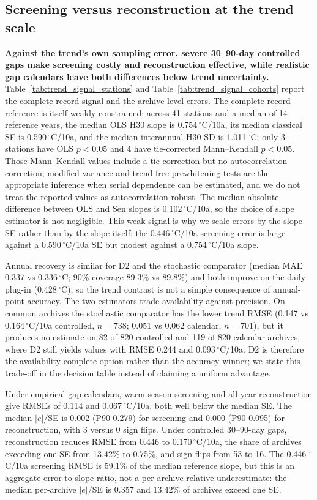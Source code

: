\subsection{Screening versus reconstruction at the trend scale}

\textbf{Against the trend's own sampling error, severe 30--90-day controlled gaps make screening costly and reconstruction effective, while realistic gap calendars leave both differences below trend uncertainty.} Table~\ref{tab:trend_signal_stations} and Table~\ref{tab:trend_signal_cohorts} report the complete-record signal and the archive-level errors. The complete-record reference is itself weakly constrained: across 41 stations and a median of 14 reference years, the median OLS $\mathrm{H30}$ slope is 0.754\,$^{\circ}$C/10a, its median classical SE is 0.590\,$^{\circ}$C/10a, and the median interannual $\mathrm{H30}$ SD is 1.011\,$^{\circ}$C; only 3 stations have OLS $p<0.05$ and 4 have tie-corrected Mann--Kendall $p<0.05$. Those Mann--Kendall values include a tie correction but no autocorrelation correction; modified variance and trend-free prewhitening tests \citep{hamed1998,yue2002} are the appropriate inference when serial dependence can be estimated, and we do not treat the reported values as autocorrelation-robust. The median absolute difference between OLS and Sen slopes is 0.102\,$^{\circ}$C/10a, so the choice of slope estimator is not negligible. This weak signal is why we scale errors by the slope SE rather than by the slope itself: the 0.446\,$^{\circ}$C/10a screening error is large against a 0.590\,$^{\circ}$C/10a SE but modest against a 0.754\,$^{\circ}$C/10a slope.

Annual recovery is similar for D2 and the stochastic comparator (median MAE 0.337 vs 0.336\,$^{\circ}$C; 90\% coverage 89.3\% vs 89.8\%) and both improve on the daily plug-in (0.428\,$^{\circ}$C), so the trend contrast is not a simple consequence of annual-point accuracy. The two estimators trade availability against precision. On common archives the stochastic comparator has the lower trend RMSE (0.147 vs 0.164\,$^{\circ}$C/10a controlled, $n{=}738$; 0.051 vs 0.062 calendar, $n{=}701$), but it produces no estimate on 82 of 820 controlled and 119 of 820 calendar archives, where D2 still yields values with RMSE 0.244 and 0.093\,$^{\circ}$C/10a. D2 is therefore the availability-complete option rather than the accuracy winner; we state this trade-off in the decision table instead of claiming a uniform advantage.

Under empirical gap calendars, warm-season screening and all-year reconstruction give RMSEs of 0.114 and 0.067\,$^{\circ}$C/10a, both well below the median SE. The median $|e|/$SE is 0.002 (P90 0.279) for screening and 0.000 (P90 0.095) for reconstruction, with 3 versus 0 sign flips. Under controlled 30--90-day gaps, reconstruction reduces RMSE from 0.446 to 0.170\,$^{\circ}$C/10a, the share of archives exceeding one SE from 13.42\% to 0.75\%, and sign flips from 53 to 16. The 0.446\,$^{\circ}$C/10a screening RMSE is 59.1\% of the median reference slope, but this is an aggregate error-to-slope ratio, not a per-archive relative underestimate: the median per-archive $|e|/$SE is 0.357 and 13.42\% of archives exceed one SE.


